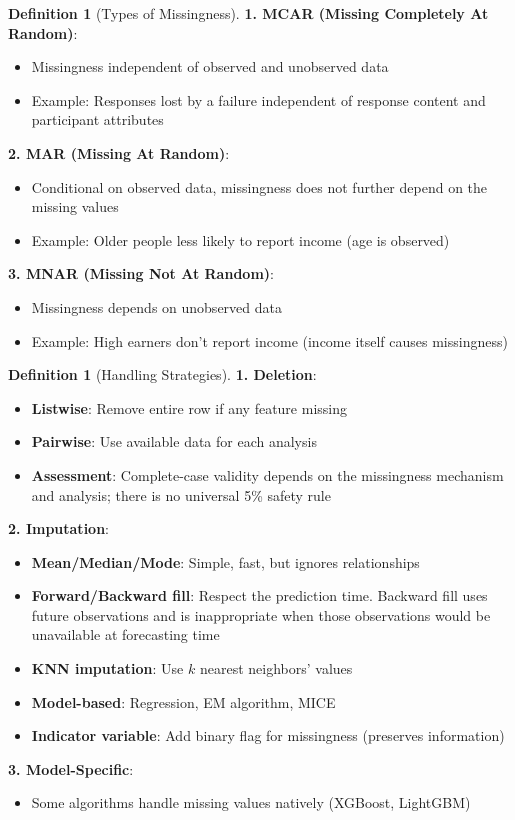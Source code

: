 \documentclass[11pt,twoside]{article}
\numberwithin{equation}{section}
\theoremstyle{plain}
\theoremstyle{definition}
\newtheorem{definition}[theorem]{Definition}
\theoremstyle{remark}
\begin{document}
\begin{definition}[Types of Missingness]

\textbf{1. MCAR (Missing Completely At Random)}:
\begin{itemize}
\item Missingness independent of observed and unobserved data
\item Example: Responses lost by a failure independent of response content and participant attributes
\end{itemize}

\textbf{2. MAR (Missing At Random)}:
\begin{itemize}
\item Conditional on observed data, missingness does not further depend on the missing values
\item Example: Older people less likely to report income (age is observed)
\end{itemize}

\textbf{3. MNAR (Missing Not At Random)}:
\begin{itemize}
\item Missingness depends on unobserved data
\item Example: High earners don't report income (income itself causes missingness)
\end{itemize}
\end{definition}

\begin{definition}[Handling Strategies]

\textbf{1. Deletion}:
\begin{itemize}
\item \textbf{Listwise}: Remove entire row if any feature missing
\item \textbf{Pairwise}: Use available data for each analysis
\item \textbf{Assessment}: Complete-case validity depends on the missingness mechanism and analysis; there is no universal 5\% safety rule
\end{itemize}

\textbf{2. Imputation}:
\begin{itemize}
\item \textbf{Mean/Median/Mode}: Simple, fast, but ignores relationships
\item \textbf{Forward/Backward fill}: Respect the prediction time. Backward fill uses future observations and is inappropriate when those observations would be unavailable at forecasting time
\item \textbf{KNN imputation}: Use $k$ nearest neighbors' values
\item \textbf{Model-based}: Regression, EM algorithm, MICE
\item \textbf{Indicator variable}: Add binary flag for missingness (preserves information)
\end{itemize}

\textbf{3. Model-Specific}:
\begin{itemize}
\item Some algorithms handle missing values natively (XGBoost, LightGBM)
\end{itemize}
\end{definition}
\end{document}
